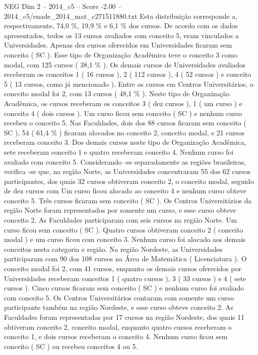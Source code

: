 \begin{textsample}{NEG Dim 2 – 2014\_c5 – Score -2.00 – 2014\_c5/enade\_2014\_mat\_c271511880.txt}
Esta distribuição corresponde a, respectivamente, 74,0 \%, 19,9 \% e 6,1 \% dos cursos.
De acordo com os dados apresentados, todos os 13 cursos avaliados com conceito 5, eram vinculados a Universidades.
Apenas dez cursos oferecidos em Universidades ficaram sem conceito ( SC ).
Esse tipo de Organização Acadêmica teve o conceito 3 como modal, com 125 cursos ( 38,1 \% ).
Os demais cursos de Universidades avaliados receberam os conceitos 1 ( 16 cursos ), 2 ( 112 cursos ), 4 ( 52 cursos ) e conceito 5 ( 13 cursos, como já mencionado ).
Entre os cursos em Centros Universitários, o conceito modal foi 2, com 13 cursos ( 48,1 \% ).
Neste tipo de Organização Acadêmica, os cursos receberam os conceitos 3 ( dez cursos ), 1 ( um curso ) e conceito 4 ( dois cursos ).
Um curso ficou sem conceito ( SC ) e nenhum curso recebeu o conceito 5.
Nas Faculdades, dois dos 88 cursos ficaram sem conceito ( SC ), 54 ( 61,4 \% ) ficaram alocados no conceito 2, conceito modal, e 21 cursos receberam conceito 3.
Dos demais cursos neste tipo de Organização Acadêmica, sete receberam conceito 1 e quatro receberam conceito 4.
Nenhum curso foi avaliado com conceito 5.
Considerando -se separadamente as regiões brasileiras, verifica -se que, na região Norte, as Universidades concentraram 55 dos 62 cursos participantes, dos quais 32 cursos obtiveram conceito 2, o conceito modal, seguido de dez cursos com Um curso ficou alocado ao conceito 4 e nenhum curso obteve conceito 5.
Três cursos ficaram sem conceito ( SC ).
Os Centros Universitários da região Norte foram representados por somente um curso, e esse curso obteve conceito 2.
As Faculdades participaram com seis cursos na região Norte.
Um curso ficou sem conceito ( SC ).
Quatro cursos obtiveram conceito 2 ( conceito modal ) e um curso ficou com conceito 3.
Nenhum curso foi alocado aos demais conceitos nesta categoria e região.
Na região Nordeste, as Universidades participaram com 90 dos 108 cursos na Área de Matemática ( Licenciatura ).
O conceito modal foi 2, com 41 cursos, enquanto os demais cursos oferecidos por Universidades receberam conceitos 1 ( quatro cursos ), 3 ( 33 cursos ) e 4 ( sete cursos ).
Cinco cursos ficaram sem conceito ( SC ) e nenhum curso foi avaliado com conceito 5.
Os Centros Universitários contaram com somente um curso participante também na região Nordeste, e esse curso obteve conceito 2.
As Faculdades foram representadas por 17 cursos na região Nordeste, dos quais 11 obtiveram conceito 2, conceito modal, enquanto quatro cursos receberam o conceito 1, e dois cursos receberam o conceito 4.
Nenhum curso ficou sem conceito ( SC ) ou recebeu conceitos 4 ou 5.

\end{textsample}
